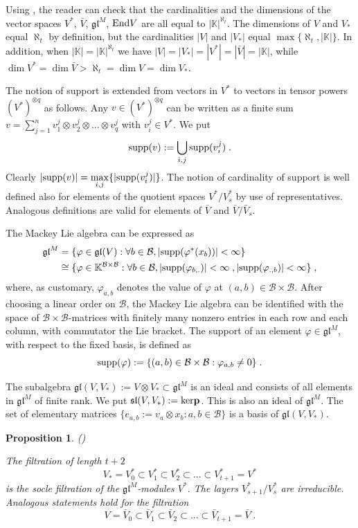 \documentclass[12pt]{article}
\def\KK {{\mathbb K}}     %
\def\B  {\mathcal B}
\def\mk {\mathfrak}
\newtheorem{prop}[theorem]{Proposition}
\begin{document}
Using \cite[Theorem 4.1]{Jacobson}, the reader can check that the cardinalities and the dimensions of the vector spaces $V^*$, $\bar V$, $\mk{gl}^M$, ${\rm End}V$ are all equal to $|\KK|^{\aleph_t}$. The dimensions of $V$ and $V_*$ equal $\aleph_t$ by definition, but the cardinalities $|V|$ and $|V_*|$ equal $\max\{\aleph_t,|\KK|\}$. In addition, when $|\KK|=|\KK|^{\aleph_t}$ we have $|V|=|V_*|=|V^*|=|\bar V|=|\KK|$, while $\dim V^*=\dim \bar V>\aleph_t=\dim V=\dim V_*$.



The notion of support is extended from vectors in $V^*$ to vectors in tensor powers $(V^*)^{\otimes q}$ as follows. Any $v\in (V^*)^{\otimes q}$ can be written as a finite sum $v=\sum\limits_{j=1}^n v_1^j\otimes v_2^j\otimes ... \otimes v_q^j$ with $v^j_i\in V^*$. We put
$$
{\rm supp}(v):=\bigcup\limits_{i,j} {\rm supp}(v_i^j) \;.
$$
Clearly $|{\rm supp}(v)|=\max\limits_{i,j}\{|{\rm supp}(v_i^j)|\}$. The notion of cardinality of support is well defined also for elements of the quotient spaces $V^*/V^*_{s}$ by use of representatives. Analogous definitions are valid for elements of $\bar V$ and $\bar V/\bar V_{s}$.

The Mackey Lie algebra can be expressed as
\begin{align*}
\mk{gl}^M &= \{\varphi\in\mk{gl}(V):\forall b\in\B, |{\rm supp}(\varphi^*(x_b))|<\infty\} \\
          &\cong \{ \varphi\in\KK^{\B\times\B} : \forall b\in\B, |{\rm supp}(\varphi_{b,.})|<\infty \;, |{\rm supp}(\varphi_{.,b})|<\infty \} \;,
\end{align*}
where, as customary, $\varphi_{a,b}$ denotes the value of $\varphi$ at $(a,b)\in\B\times \B$. After choosing a linear order on $\B$, the Mackey Lie algebra can be identified with the space of $\B\times \B$-matrices with finitely many nonzero entries in each row and each column, with commutator the Lie bracket. The support of an element $\varphi\in\mk{gl}^M$, with respect to the fixed basis, is defined as
$$
{\rm supp}(\varphi) := \{(a,b)\in\B\times\B:\varphi_{a,b}\ne 0\} \;.
$$

The subalgebra $\mk{gl}(V,V_*):=V\otimes V_*\subset \mk{gl}^M$ is an ideal and consists of all elements in $\mk{gl}^M$ of finite rank. We put $\mk{sl}(V,V_*):={\rm ker}{\bf p}$. This is also an ideal of $\mk{gl}^M$. The set of elementary matrices $\{e_{a,b}:=v_a\otimes x_b:a,b\in\B\}$ is a basis of $\mk{gl}(V,V_*)$.


\begin{prop} (\cite{Chirvasitu-Penkov-RC})

The filtration of length $t+2$
$$
V_*=V^*_{0}\subset V^*_{1}\subset V^*_{2}\subset ... \subset V^*_{t+1}= V^*
$$
is the socle filtration of the $\mk{gl}^M$-modules $V^*$. The layers $V^*_{s+1}/V^*_{s}$ are irreducible. Analogous statements hold for the filtration 
$$
V=\bar V_{0}\subset \bar V_{1}\subset \bar V_{2}\subset ... \subset \bar V_{t+1}= \bar V\;.
$$
\end{prop}
\end{document}
